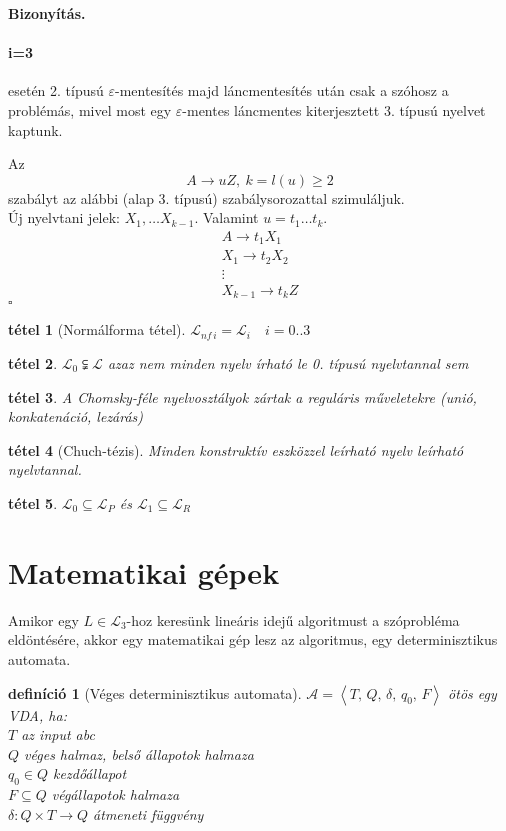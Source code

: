 \documentclass[fleqn,10pt,a4paper]{article}
\newcommand{\ob}{\hfill$\square$}
\renewcommand{\epsilon}{\varepsilon}
\theoremstyle{magyar}
\newtheorem{de}{definíció}[section]
\newtheorem{te}{tétel}[section]
\newenvironment{biz}{\begin{trivlist}\item\relax\mbox{\textbf{Bizonyítás.\enskip}}\ignorespaces}{\ob\end{trivlist}}
\newcommand{\Lang}{\mathcal{L}}
\begin{document}
\begin{biz}
    \paragraph{i=3} esetén 2. típusú $\epsilon$-mentesítés majd láncmentesítés után csak a szóhosz a problémás, mivel
    most egy $\epsilon$-mentes láncmentes kiterjesztett 3. típusú nyelvet kaptunk.

    \newpage
    \noindent Az
    \[A\to uZ, \ k=l(u) \geq2\]
    szabályt az alábbi (alap 3. típusú) szabálysorozattal szimuláljuk.\\
    Új nyelvtani jelek: $X_1, \ldots X_{k-1}$. Valamint $u=t_1\ldots  t_k$.
    \begin{gather*}
      A\to t_1 X_1\\
      X_1\to t_2 X_2\\
      \vdots\\
      X_{k-1}\to t_k Z
    \end{gather*}
  \end{biz}

  \begin{te}[Normálforma tétel] $\Lang_{nf\,i}=\Lang_i\quad i=0..3$
  \end{te}

  \begin{te} $\Lang_{0}\subsetneqq \Lang$ azaz nem minden nyelv írható le 0. típusú nyelvtannal sem
  \end{te}
  
  \begin{te} A Chomsky-féle nyelvosztályok zártak a reguláris műveletekre (unió, konkatenáció, lezárás)
  \end{te}

  \begin{te}[Chuch-tézis] Minden konstruktív eszközzel leírható nyelv leírható nyelvtannal.
  \end{te}
  
  \begin{te} $\Lang_0 \subseteq \Lang_P$ és $\Lang_1\subseteq \Lang_R$
  \end{te}
  
  \newpage
  \section{Matematikai gépek}
  Amikor egy $L\in \Lang_3$-hoz keresünk lineáris idejű algoritmust a szóprobléma eldöntésére, akkor egy matematikai
  gép lesz az algoritmus, egy determinisztikus automata.

  \begin{de}[Véges determinisztikus automata] $\mathcal A = \left< T,\,Q,\,\delta,\,q_0,\,F\right>$ ötös egy VDA, ha:\\
    $T$ az input abc\\
    $Q$ véges halmaz, belső állapotok halmaza\\
    $q_0\in Q$ kezdőállapot\\
    $F\subseteq Q$ végállapotok halmaza\\
    $\delta\colon Q\times T\to Q$ átmeneti függvény
  \end{de}
\end{document}
